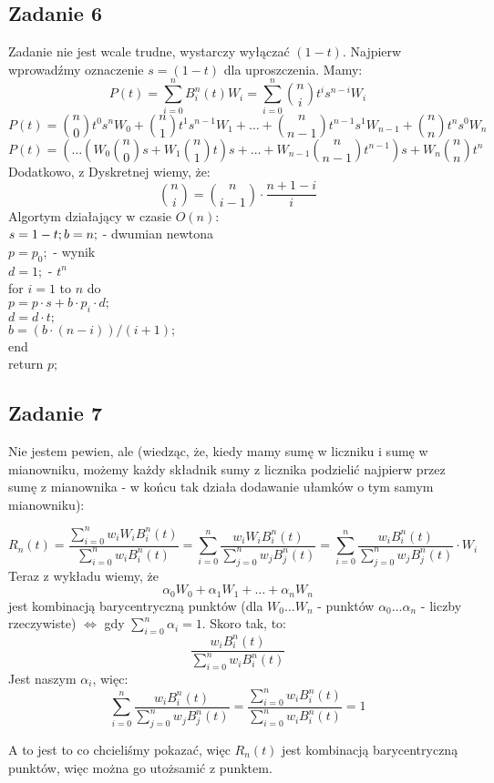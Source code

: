 \documentclass[a4paper]{article}
\begin{document}
\subsection*{Zadanie 6}
Zadanie nie jest wcale trudne, wystarczy wyłączać $(1-t)$. Najpierw wprowadźmy oznaczenie $s=(1-t)$ dla uproszczenia. Mamy:\\
$$P(t)=\sum\limits_{i=0}^n B_i^n(t)W_i = \sum\limits_{i=0}^n {n \choose i}t^i s^{n-i} W_i$$
$$P(t) = {n \choose 0} t^0 s^{n} W_0 + {n \choose 1} t^1 s^{n-1} W_1 + \dots + {n \choose n-1}t^{n-1} s^1 W_{n-1} + {n \choose n}t^n s^0 W_n$$
$$P(t) = \left( \dots \left( W_0 {n \choose 0} s + W_1 {n \choose 1}t\right) s + \dots + W_{n-1}{n \choose n-1}t^{n-1}\right)s + W_n{n \choose n}t^n $$
Dodatkowo, z Dyskretnej wiemy, że:
$${n \choose i} = {n \choose i-1} \cdot \frac{n+1-i}{i} $$
Algortym działający w czasie $O(n)$:\\
$s = 1-t;\\
b=n; $ - dwumian newtona\\
$p=p_0; $ - wynik\\
$d=1;$ - $t^n$ \\
for $i=1$ to $n$ do\\
\phantom{xx}$p=p\cdot s + b\cdot p_i\cdot d ;$\\
\phantom{xx}$d=d\cdot t;$\\
\phantom{xx}$b=(b\cdot(n-i))/(i+1);$\\
end\\
return $p;$


\subsection*{Zadanie 7}
Nie jestem pewien, ale (wiedząc, że, kiedy mamy sumę w liczniku i sumę w mianowniku, możemy każdy składnik sumy z licznika podzielić najpierw przez sumę z mianownika - w końcu tak działa dodawanie ułamków o tym samym mianowniku):

$$R_n(t)=\frac{\sum\limits_{i=0}^n w_iW_iB_i^n(t)}{\sum\limits_{i=0}^nw_iB_i^n(t)} = \sum\limits_{i=0}^n \frac{w_iW_iB_i^n(t)}{\sum\limits_{j=0}^nw_jB_j^n(t)} = \sum\limits_{i=0}^n \frac{w_iB_i^n(t)}{\sum\limits_{j=0}^nw_jB_j^n(t)}\cdot W_i$$
Teraz z wykładu wiemy, że $$\alpha_0 W_0  + \alpha_1 W_1 + \dots + \alpha_n W_n$$ 
jest kombinacją barycentryczną punktów (dla $W_0 \dots W_n$ - punktów $\alpha_0 \dots \alpha_n$ - liczby rzeczywiste) $\Leftrightarrow$ gdy $\sum\limits_{i=0}^n \alpha_i = 1$. 
Skoro tak, to:
$$ \frac{w_iB_i^n(t)}{\sum\limits_{i=0}^nw_iB_i^n(t)} $$
Jest naszym $\alpha_i$, więc:
$$ \sum\limits_{i=0}^n \frac{w_iB_i^n(t)}{\sum\limits_{j=0}^nw_jB_j^n(t)} = \frac{\sum\limits_{i=0}^n w_iB_i^n(t)}{\sum\limits_{i=0}^nw_iB_i^n(t)} = 1$$

A to jest to co chcieliśmy pokazać, więc $R_n(t)$ jest kombinacją barycentryczną punktów, więc można go utożsamić z punktem.
\end{document}
